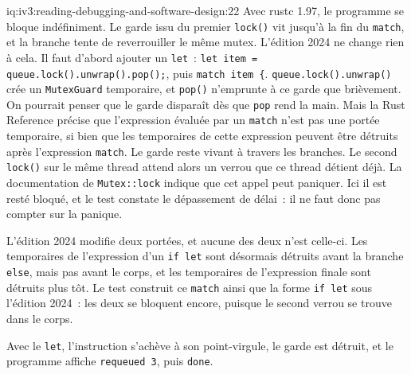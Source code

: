 \begin{solution}{iq:iv3:reading-debugging-and-software-design:22}
Avec rustc 1.97, le programme se bloque indéfiniment. Le garde issu du premier \texttt{lock()} vit jusqu'à la fin du \texttt{match}, et la branche tente de reverrouiller le même mutex. L'édition 2024 ne change rien à cela. Il faut d'abord ajouter un \texttt{let}~: \texttt{let item = queue.lock().unwrap().pop();}, puis
\texttt{match item \{}. 
\texttt{queue.lock().unwrap()} crée un \texttt{MutexGuard} temporaire, et \texttt{pop()} n'emprunte à ce garde que brièvement. On pourrait penser que le garde disparaît dès que \texttt{pop} rend la main. Mais la Rust Reference précise que l'expression évaluée par un \texttt{match} n'est pas une portée temporaire, si bien que les temporaires de cette expression peuvent être détruits après l'expression \texttt{match}. Le garde reste vivant à travers les branches. Le second \texttt{lock()} sur le même thread attend alors un verrou que ce thread détient déjà. La documentation de \texttt{Mutex::lock} indique que cet appel peut paniquer. Ici il est resté bloqué, et le test constate le dépassement de délai~: il ne faut donc pas compter sur la panique.

L'édition 2024 modifie deux portées, et aucune des deux n'est celle-ci. Les temporaires de l'expression d'un \texttt{if let} sont désormais détruits avant la branche \texttt{else}, mais pas avant le corps, et les temporaires de l'expression finale sont détruits plus tôt. Le test construit ce \texttt{match} ainsi que la forme \texttt{if let} sous l'édition 2024~: les deux se bloquent encore, puisque le second verrou se trouve dans le corps.

Avec le \texttt{let}, l'instruction s'achève à son point-virgule, le garde est détruit, et le programme affiche \texttt{requeued 3}, puis \texttt{done}.


\end{solution}

